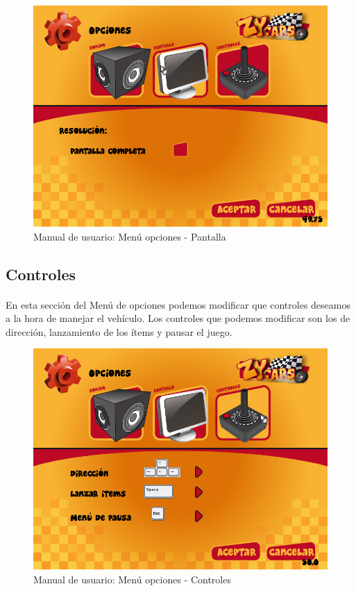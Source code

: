 \begin{figure}[H]
  \label{menu_pantalla}
  \begin{center}
    \includegraphics[scale=0.4]{imagenes/capturas/menuopcionespantalla.png}
  \end{center}
 \caption{Manual de usuario: Menú opciones - Pantalla}
\end{figure}

\subsection{Controles}

\paragraph{}
En esta sección del Menú de opciones podemos modificar que controles deseamos a la hora de manejar el vehículo. Los 
controles que podemos modificar son los de dirección, lanzamiento de los ítems y pausar el juego.

\begin{figure}[H]
  \label{menu_controles}
  \begin{center}
    \includegraphics[scale=0.4]{imagenes/capturas/menuopcionescontroles.png}
  \end{center}
 \caption{Manual de usuario: Menú opciones - Controles}
\end{figure}


